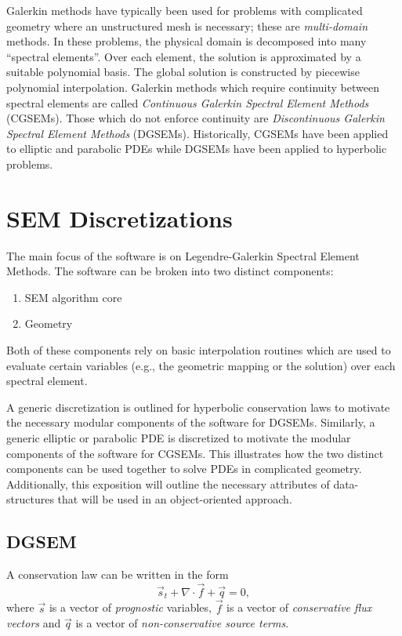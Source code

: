 \documentclass[12pt]{softwaremanual}
\begin{document}
Galerkin methods have typically been used for problems with complicated geometry where an unstructured mesh is necessary; these are \textit{multi-domain} methods. In these problems, the physical domain is decomposed into many ``spectral elements''. Over each element, the solution is approximated by a suitable polynomial basis. The global solution is constructed by piecewise polynomial interpolation. Galerkin methods which require continuity between spectral elements are called \textit{Continuous Galerkin Spectral Element Methods} (CGSEMs). Those which do not enforce continuity are \textit{Discontinuous Galerkin Spectral Element Methods} (DGSEMs). Historically, CGSEMs have been applied to elliptic and parabolic PDEs while DGSEMs have been applied to hyperbolic problems.  

\chapter{SEM Discretizations}
The main focus of the software is on Legendre-Galerkin Spectral Element Methods. The software can be broken into two distinct components:
\begin{enumerate}
\item SEM algorithm core
\item Geometry
\end{enumerate}
Both of these components rely on basic interpolation routines which are used to evaluate certain variables (e.g., the geometric mapping or the solution) over each spectral element.

A generic discretization is outlined for hyperbolic conservation laws to motivate the necessary modular components of the software for DGSEMs. Similarly, a generic elliptic or parabolic PDE is discretized to motivate the modular components of the software for CGSEMs. This illustrates how the two distinct components can be used together to solve PDEs in complicated geometry. Additionally, this exposition will outline the necessary attributes of data-structures that will be used in an object-oriented approach.

\section{DGSEM}\label{sec:DGSEMtheory}
A conservation law can be written in the form
  \begin{equation}
 \vec{s}_t + \nabla \cdot \vec{f} + \vec{q} = 0, \label{eq:ConservationForm}
 \end{equation}
 where $\vec{s}$ is a vector of \textit{prognostic} variables, $\vec{f}$ is a vector of \textit{conservative flux vectors} and $\vec{q}$ is a vector of \textit{non-conservative source terms}.
 
\end{document}
